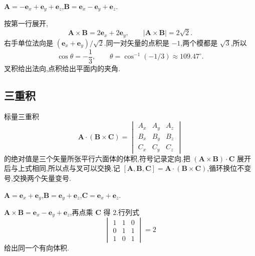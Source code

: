 \begin{example}
$\mathbf{A}=-\mathbf{e}_x+\mathbf{e}_y+\mathbf{e}_z$,$\mathbf{B}=\mathbf{e}_x-\mathbf{e}_y+\mathbf{e}_z$.
\end{example}
\begin{solution}
按第一行展开,
\begin{equation}
  \mathbf{A}\times\mathbf{B}=2\mathbf{e}_x+2\mathbf{e}_y,
  \qquad
  |\mathbf{A}\times\mathbf{B}|=2\sqrt{2}.
\end{equation}
右手单位法向是 $(\mathbf{e}_x+\mathbf{e}_y)/\sqrt{2}$.同一对矢量的点积是 $-1$,两个模都是 $\sqrt{3}$,所以
\begin{equation}
  \cos\theta=-\frac13,
  \qquad
  \theta=\cos^{-1}(-1/3)\approx 109.47^\circ.
\end{equation}
叉积给出法向,点积给出平面内的夹角.
\end{solution}

\subsection{三重积}
标量三重积
\begin{equation}
  \mathbf{A}\cdot(\mathbf{B}\times\mathbf{C})
  =
  \begin{vmatrix}
    A_x & A_y & A_z \\
    B_x & B_y & B_z \\
    C_x & C_y & C_z
  \end{vmatrix}
\end{equation}
的绝对值是三个矢量所张平行六面体的体积,符号记录定向.把 $(\mathbf{A}\times\mathbf{B})\cdot\mathbf{C}$ 展开后与上式相同,所以点与叉可以交换.记 $[\mathbf{A},\mathbf{B},\mathbf{C}]=\mathbf{A}\cdot(\mathbf{B}\times\mathbf{C})$,循环换位不变号,交换两个矢量变号.

\begin{example}
$\mathbf{A}=\mathbf{e}_x+\mathbf{e}_y$,$\mathbf{B}=\mathbf{e}_y+\mathbf{e}_z$,$\mathbf{C}=\mathbf{e}_x+\mathbf{e}_z$.
\end{example}
\begin{solution}
$\mathbf{A}\times\mathbf{B}=\mathbf{e}_x-\mathbf{e}_y+\mathbf{e}_z$,再点乘 $\mathbf{C}$ 得 $2$.行列式
\begin{equation}
  \begin{vmatrix}
    1 & 1 & 0 \\
    0 & 1 & 1 \\
    1 & 0 & 1
  \end{vmatrix}
  =2
\end{equation}
给出同一个有向体积.
\end{solution}

